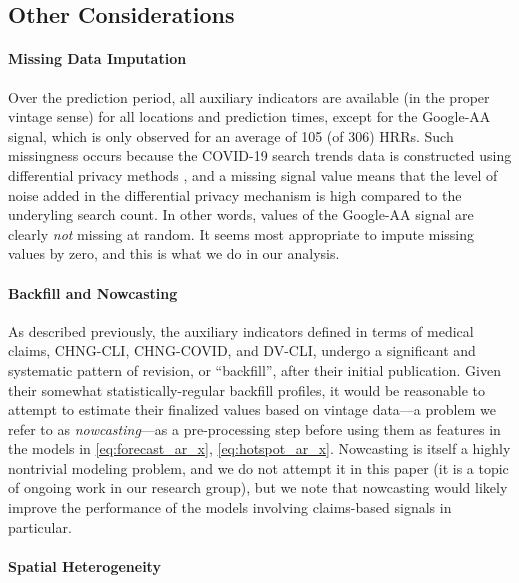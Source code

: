 \documentclass[9pt,twocolumn,twoside,lineno]{pnas-new}
\begin{document}
\subsection{Other Considerations}

\paragraph{Missing Data Imputation}

Over the prediction period, all auxiliary indicators are available (in the
proper vintage sense) for all locations and prediction times, except for the
Google-AA signal, which is only observed for an average of 105 (of 306) HRRs.
Such missingness occurs because the COVID-19 search trends data is
constructed using differential privacy methods \cite{Bavadekar:2020}, and a 
missing signal value means that the level of noise added in the differential
privacy mechanism is high compared to the underyling search count.  In other
words, values of the Google-AA signal are clearly \textit{not} missing at
random.  It seems most appropriate to impute missing values by zero, and this 
is what we do in our analysis.

\paragraph{Backfill and Nowcasting}  

As described previously, the auxiliary indicators defined in terms of medical
claims, CHNG-CLI, CHNG-COVID, and DV-CLI, undergo a significant and systematic
pattern of revision, or ``backfill'', after their initial publication.  Given
their somewhat statistically-regular backfill profiles, it would be reasonable
to attempt to estimate their finalized values based on vintage data---a problem
we refer to as \textit{nowcasting}---as a pre-processing step before using them
as features in the models in \eqref{eq:forecast_ar_x}, \eqref{eq:hotspot_ar_x}. 
Nowcasting is itself a highly nontrivial modeling problem, and we do not attempt
it in this paper (it is a topic of ongoing work in our research group), but we
note that nowcasting would likely improve the performance of the models
involving claims-based signals in particular.        

\paragraph{Spatial Heterogeneity} 
\end{document}
